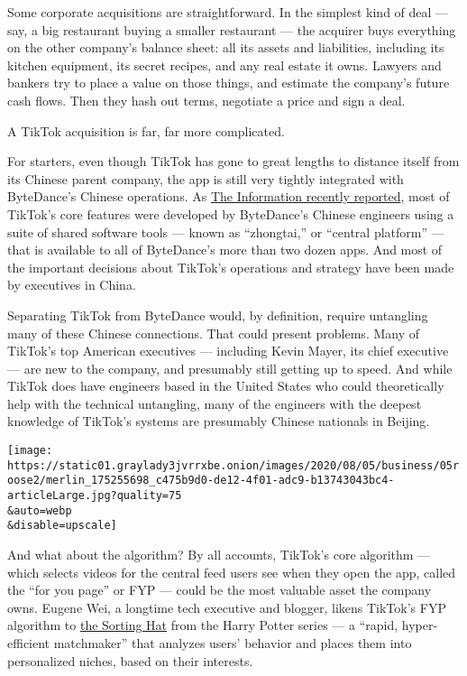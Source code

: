 Some corporate acquisitions are straightforward. In the simplest kind of
deal --- say, a big restaurant buying a smaller restaurant --- the
acquirer buys everything on the other company's balance sheet: all its
assets and liabilities, including its kitchen equipment, its secret
recipes, and any real estate it owns. Lawyers and bankers try to place a
value on those things, and estimate the company's future cash flows.
Then they hash out terms, negotiate a price and sign a deal.

A TikTok acquisition is far, far more complicated.

For starters, even though TikTok has gone to great lengths to distance
itself from its Chinese parent company, the app is still very tightly
integrated with ByteDance's Chinese operations. As
\href{https://www.theinformation.com/articles/breaking-off-tiktok-will-be-hard-to-do}{The
Information recently reported}, most of TikTok's core features were
developed by ByteDance's Chinese engineers using a suite of shared
software tools --- known as ``zhongtai,'' or ``central platform'' ---
that is available to all of ByteDance's more than two dozen apps. And
most of the important decisions about TikTok's operations and strategy
have been made by executives in China.

Separating TikTok from ByteDance would, by definition, require
untangling many of these Chinese connections. That could present
problems. Many of TikTok's top American executives --- including Kevin
Mayer, its chief executive --- are new to the company, and presumably
still getting up to speed. And while TikTok does have engineers based in
the United States who could theoretically help with the technical
untangling, many of the engineers with the deepest knowledge of TikTok's
systems are presumably Chinese nationals in Beijing.

\texttt{[image: https://static01.graylady3jvrrxbe.onion/images/2020/08/05/business/05roose2/merlin\_175255698\_c475b9d0-de12-4f01-adc9-b13743043bc4-articleLarge.jpg?quality=75\\\&auto=webp\\\&disable=upscale]}

And what about the algorithm? By all accounts, TikTok's core algorithm
--- which selects videos for the central feed users see when they open
the app, called the ``for you page'' or FYP --- could be the most
valuable asset the company owns. Eugene Wei, a longtime tech executive
and blogger, likens TikTok's FYP algorithm to
\href{https://www.eugenewei.com/blog/2020/8/3/tiktok-and-the-sorting-hat}{the
Sorting Hat} from the Harry Potter series --- a ``rapid, hyper-efficient
matchmaker'' that analyzes users' behavior and places them into
personalized niches, based on their interests.

